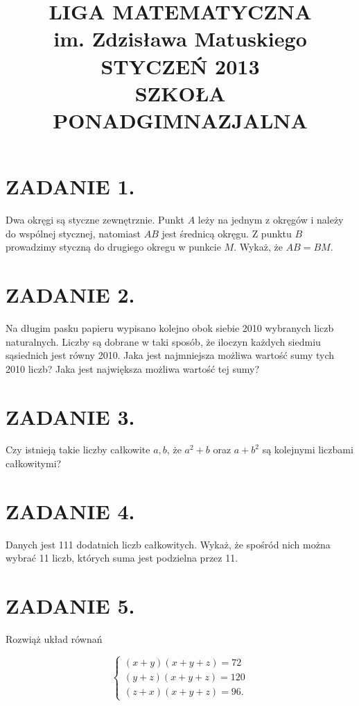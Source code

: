 \documentclass[10pt]{article}
\title{LIGA MATEMATYCZNA \\
 im. Zdzisława Matuskiego \\
 STYCZEŃ 2013 \\
 SZKOŁA PONADGIMNAZJALNA }
\author{}
\date{}
\begin{document}
\maketitle
\section*{ZADANIE 1.}
Dwa okręgi są styczne zewnętrznie. Punkt \(A\) leży na jednym z okręgów i należy do wspólnej stycznej, natomiast \(A B\) jest średnicą okręgu. Z punktu \(B\) prowadzimy styczną do drugiego okregu w punkcie \(M\). Wykaż, że \(A B=B M\).

\section*{ZADANIE 2.}
Na długim pasku papieru wypisano kolejno obok siebie 2010 wybranych liczb naturalnych. Liczby są dobrane w taki sposób, że iloczyn każdych siedmiu sąsiednich jest równy 2010. Jaka jest najmniejsza możliwa wartość sumy tych 2010 liczb? Jaka jest największa możliwa wartość tej sumy?

\section*{ZADANIE 3.}
Czy istnieją takie liczby całkowite \(a, b\), że \(a^{2}+b\) oraz \(a+b^{2}\) są kolejnymi liczbami całkowitymi?

\section*{ZADANIE 4.}
Danych jest 111 dodatnich liczb całkowitych. Wykaż, że spośród nich można wybrać 11 liczb, których suma jest podzielna przez 11.

\section*{ZADANIE 5.}
Rozwiąż układ równań

\[
\left\{\begin{array}{l}
(x+y)(x+y+z)=72 \\
(y+z)(x+y+z)=120 \\
(z+x)(x+y+z)=96 .
\end{array}\right.
\]
\end{document}
